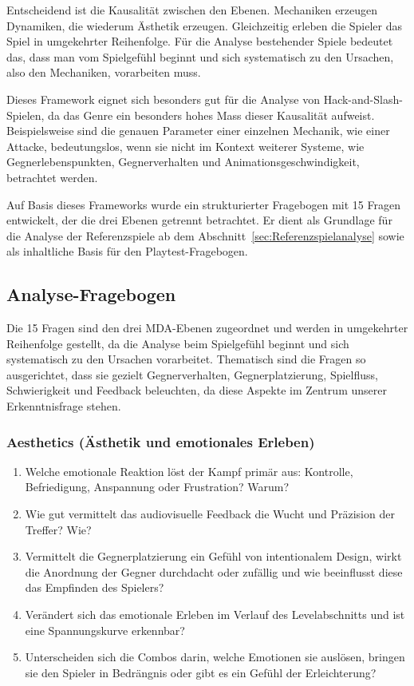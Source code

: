 \documentclass[../Main.tex]{subfiles}
\begin{document}
Entscheidend ist die Kausalität zwischen den Ebenen. Mechaniken erzeugen Dynamiken, die wiederum Ästhetik erzeugen. Gleichzeitig erleben die Spieler das Spiel in umgekehrter Reihenfolge. Für die Analyse bestehender Spiele bedeutet das, dass man vom Spielgefühl beginnt und sich systematisch zu den Ursachen, also den Mechaniken, vorarbeiten muss.

Dieses Framework eignet sich besonders gut für die Analyse von Hack-and-Slash-Spielen, da das Genre ein besonders hohes Mass dieser Kausalität aufweist. Beispielsweise sind die genauen Parameter einer einzelnen Mechanik, wie einer Attacke, bedeutungslos, wenn sie nicht im Kontext weiterer Systeme, wie Gegnerlebenspunkten, Gegnerverhalten und Animationsgeschwindigkeit, betrachtet werden.\autocite{hunicke2004mda}

Auf Basis dieses Frameworks wurde ein strukturierter Fragebogen mit 15 Fragen entwickelt, der die drei Ebenen getrennt betrachtet. Er dient als Grundlage für die Analyse der Referenzspiele ab dem Abschnitt~\ref{sec:Referenzspielanalyse} sowie als inhaltliche Basis für den Playtest-Fragebogen.


\subsection{Analyse-Fragebogen} \label{sec:Analysefragebogen}

Die 15 Fragen sind den drei MDA-Ebenen zugeordnet und werden in umgekehrter Reihenfolge gestellt, da die Analyse beim Spielgefühl beginnt und sich systematisch zu den Ursachen vorarbeitet. Thematisch sind die Fragen so ausgerichtet, dass sie gezielt Gegnerverhalten, Gegnerplatzierung, Spielfluss, Schwierigkeit und Feedback beleuchten, da diese Aspekte im Zentrum unserer Erkenntnisfrage stehen.

\subsubsection{Aesthetics (Ästhetik und emotionales Erleben)}

\begin{enumerate}[label=\textbf{A\arabic*}, leftmargin=1.5cm, itemsep=0.5em]
    \item Welche emotionale Reaktion löst der Kampf primär aus: Kontrolle, Befriedigung, Anspannung oder Frustration? Warum?
    \item Wie gut vermittelt das audiovisuelle Feedback die Wucht und Präzision der Treffer? Wie?
    \item Vermittelt die Gegnerplatzierung ein Gefühl von intentionalem Design, wirkt die Anordnung der Gegner durchdacht oder zufällig und wie beeinflusst diese das Empfinden des Spielers?
    \item Verändert sich das emotionale Erleben im Verlauf des Levelabschnitts und ist eine Spannungskurve erkennbar?
    \item Unterscheiden sich die Combos darin, welche Emotionen sie auslösen, bringen sie den Spieler in Bedrängnis oder gibt es ein Gefühl der Erleichterung?
\end{enumerate}
\end{document}
